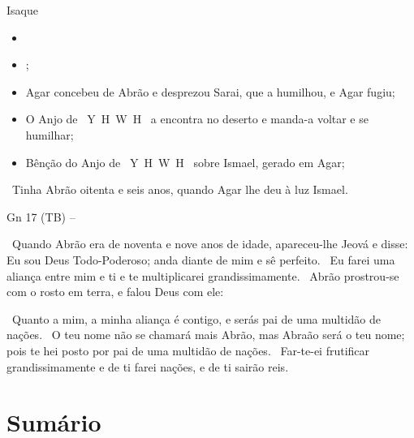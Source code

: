 \documentclass[12pt,aspectratio=169]{beamer}
\newcommand{\YA}{%
    \mbox{%
        Y\makebox[0pt][l]{\hspace{-0.178em}\raisebox{-0.00ex}{\scalebox{0.30}{E}}}%
        H\makebox[0pt][l]{\hspace{-0.010em}\raisebox{-0.00ex}{\scalebox{0.30}{O}}}%
        W\makebox[0pt][l]{\hspace{-0.245em}\raisebox{-0.00ex}{\scalebox{0.30}{A}}}%
        H%
    }%
}
\newcommand{\ver}[1]{%
    \raisebox{0.50ex}{%
        \scalebox{1.1}{%
            \pmb{\textbf{\textcolor{BSpbg}{#1}}}%
        }%
    }%
}
\newcommand{\QUOTE}[1]{%
    \par\noindent\hspace*{0.05\linewidth}%
    \begin{minipage}{0.9\linewidth}%
        \linespread{1.35}\large{#1}%
    \end{minipage}%
}
\newcommand{\YEL}[1]{{\textcolor{TXyel}{#1}}}
\newcommand{\CYA}[1]{{\textcolor{TXcya}{#1}}}
\newcommand{\BLU}[1]{{\textcolor{TXblu}{#1}}}
\newcommand{\MAG}[1]{{\textcolor{TXmag}{#1}}}
\newcommand{\BRI}[1]{{\textcolor{BSpbg}{#1}}}   %
\begin{document}
    \begin{frame}{\YEL{Isaque}}
        \begin{itemize}
            \item 
            \item ;
            \item Agar concebeu de Abrão e desprezou Sarai, que a humilhou, e Agar fugiu;
            \item O \BRI{Anjo de \YA} a encontra no deserto e manda-a voltar e se humilhar;
            \item Bênção do \BRI{Anjo de \YA} sobre Ismael, gerado em Agar;
        \end{itemize}

        \vspace{1.5\bigskipamount}

        \QUOTE{
            \ver{16}~Tinha Abrão \YEL{oitenta e seis anos}, quando Agar lhe deu à luz Ismael.
        }
    \end{frame}

    \begin{frame}[allowframebreaks]{\BRI{Gn 17} (TB) --}
        \QUOTE{%
            \ver{1}~Quando Abrão era de \YEL{noventa e nove anos} de idade, apareceu-lhe Jeová e
            disse: \CYA{Eu sou Deus Todo-Poderoso}; \MAG{anda diante de mim e sê perfeito}.
            \ver{2}~\BLU{Eu farei} uma \YEL{aliança} entre mim e ti e te \YEL{multiplicarei
            grandissimamente}.
            \ver{3}~Abrão prostrou-se com o rosto em terra, e falou Deus com ele:
        }

        \pagebreak

        \QUOTE{%
            \ver{4}~Quanto a mim, a minha aliança é contigo, e serás \YEL{pai de uma multidão de
            nações}.
            \ver{5}~O teu nome não se chamará mais Abrão, mas \YEL{Abraão será o teu nome}; pois
            te hei posto por \YEL{pai de uma multidão de nações}.
            \ver{6}~Far-te-ei frutificar grandissimamente e de ti farei \YEL{nações}, e de ti
            sairão \MAG{reis}.
        }

    \end{frame}

\section{Sumário}
\end{document}
